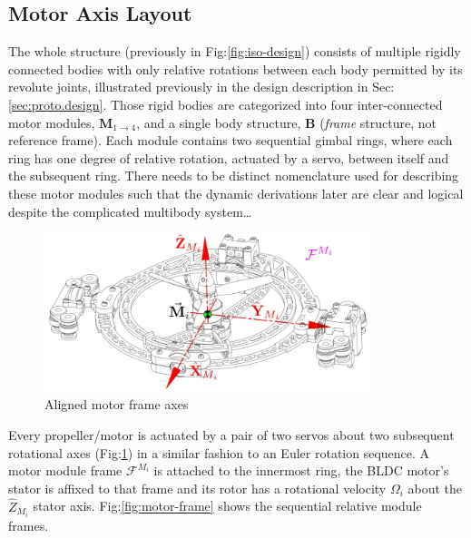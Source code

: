 \subsection{Motor Axis Layout}
\label{subsec:proto.conventions.motoraxis}
The whole structure (previously in Fig:\ref{fig:iso-design}) consists of multiple rigidly connected bodies with only relative rotations between each body permitted by its revolute joints, illustrated previously in the design description in Sec:\ref{sec:proto.design}. Those rigid bodies are categorized into four inter-connected motor modules, $\mathbf{M}_{1\rightarrow 4}$, and a single body structure, $\mathbf{B}$ (\emph{frame} structure, not reference frame). Each module contains two sequential gimbal rings, where each ring has one degree of relative rotation, actuated by a servo, between itself and the subsequent ring. There needs to be distinct nomenclature used for describing these motor modules such that the dynamic derivations later are clear and logical despite the complicated multibody system\ldots
\par
\begin{figure}[htbp]
\vspace{-6pt}
\centering
\includegraphics[width=0.85\textwidth]{figs/motor-axes}
\caption{Aligned motor frame axes}
\label{fig:motor-axes}
\vspace{-6pt}
\end{figure}
Every propeller/motor is actuated by a pair of two servos about two subsequent rotational axes (Fig:\ref{fig:motor-axes}) in a similar fashion to an Euler rotation sequence. A motor module frame $\mathcal{F}^{M_i}$ is attached to the innermost ring, the BLDC motor's stator is affixed to that frame and its rotor has a rotational velocity $\Omega_i$ about the $\hat{Z}_{M_i}$ stator axis. Fig:\ref{fig:motor-frame} shows the sequential relative module frames.
